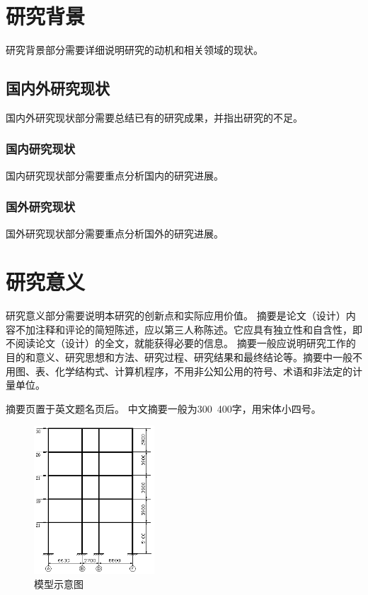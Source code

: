 \documentclass{document}
\begin{document}
\pagestyle{essaystyle}


\section{研究背景}
研究背景部分需要详细说明研究的动机和相关领域的现状。

\subsection{国内外研究现状}
国内外研究现状部分需要总结已有的研究成果，并指出研究的不足。

\subsubsection{国内研究现状}
国内研究现状部分需要重点分析国内的研究进展。

\subsubsection{国外研究现状}
国外研究现状部分需要重点分析国外的研究进展。

\section{研究意义}
研究意义部分需要说明本研究的创新点和实际应用价值。
摘要是论文（设计）内容不加注释和评论的简短陈述，应以第三人称陈述。它应具有独立性和自含性，即不阅读论文（设计）的全文，就能获得必要的信息。
摘要一般应说明研究工作的目的和意义、研究思想和方法、研究过程、研究结果和最终结论等。摘要中一般不用图、表、化学结构式、计算机程序，不用非公知公用的符号、术语和非法定的计量单位。\cite{YXXY20250307001}%


摘要页置于英文题名页后。 
中文摘要一般为300~400字，用宋体小四号。
\begin{figure}[htbp]
    \centering
    \includegraphics[width=0.4\textwidth]{assets/images/image.png}
    \caption{模型示意图}
    \label{fig:model}%
\end{figure}
\end{document}

